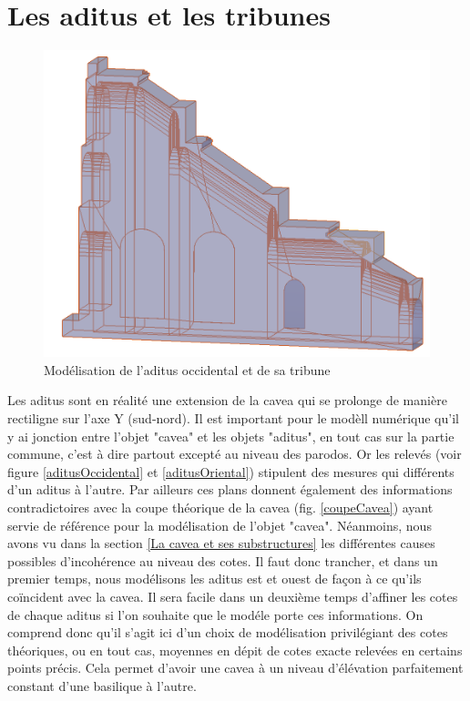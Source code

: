 		
\section{Les \gls{aditus} et les tribunes} 

\begin{figure}[!h]
	\includegraphics[width=\linewidth]{images/modAditus}
	\caption{Modélisation de l'\gls{aditus} occidental et de sa tribune} 
	\label{modAditus} 
\end{figure}  
		
Les aditus sont en réalité une extension de la cavea qui se prolonge de manière rectiligne sur l'axe Y (sud-nord). Il est important pour le modèll numérique qu'il y ai jonction entre l'objet "cavea" et les objets "aditus", en tout cas sur la partie commune, c'est à dire partout excepté au niveau des \gls{parodos}. Or les relevés (voir figure \ref{aditusOccidental} et \ref{aditusOriental}) stipulent des mesures qui différents d'un aditus à l'autre. Par ailleurs ces plans donnent également des informations contradictoires avec la coupe théorique de la cavea (fig. \ref{coupeCavea}) ayant servie de référence pour la modélisation de l'objet "cavea". Néanmoins, nous avons vu dans la section \ref{La cavea et ses substructures} les différentes causes possibles d'incohérence au niveau des cotes. Il faut donc trancher, et dans un premier temps, nous modélisons les aditus est et ouest de façon à ce qu'ils coïncident avec la cavea. Il sera facile dans un deuxième temps d'affiner les cotes de chaque aditus si l'on souhaite que le modéle porte ces informations. On comprend donc qu'il s'agit ici d'un choix de modélisation privilégiant des cotes théoriques, ou en tout cas, moyennes en dépit de cotes exacte relevées en certains points précis. Cela permet d'avoir une cavea à un niveau d'élévation parfaitement constant d'une basilique à l'autre. 

